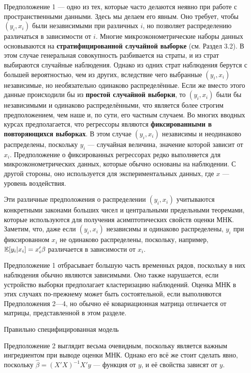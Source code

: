 Предположение 1 --- одно из тех, которые часто делаются неявно при работе с пространственными данными. Здесь мы делаем его явным. Оно требует, чтобы $(y_i, x_i)$ были независимыми при различных $i$, но позволяет распределению различаться в зависимости от $i$. Многие микроэконометрические наборы данных основываются на \textbf{стратифицированной случайной выборке} (см. Раздел 3.2). В этом случае генеральная совокупность разбивается на страты, и из страт выбираются случайные наблюдения. Однако из одних страт наблюдения берутся с большей вероятностью, чем из других, вследствие чего выбранные $(y_i, x_i)$ независимые, но необязательно одинаково распределённые. Если же вместо этого данные происходили бы из \textbf{простой случайной выборки}, то $(y_i, x_i)$  были бы независимыми и одинаково распределёнными, что является более строгим предположением, чем наше и, по сути, его частным случаем. Во многих вводных курсах предполагается, что регрессоры являются \textbf{фиксированными в повторяющихся выборках}. В этом случае  $(y_i, x_i)$ независимы и неодинаково распределены, поскольку $y_i$ --- случайная величина, значение которой зависит от $x_i$. Предположение о фиксированных регрессорах редко выполняется для микроэконометрических данных, которые обычно основаны на наблюдении. С другой стороны, оно используется для экспериментальных данных, где $x$ --- уровень воздействия.

Эти различные предположения о распределении $(y_i, x_i)$ учитываются конкретными законами больших чисел и центральными предельными теоремами, которые используются для получения асимптотических свойств оценки МНК. Заметим, что, даже если $(y_i, x_i)$ независимы и одинаково распределены, $y_i$ при фиксированном $x_i$ не одинаково распределены, поскольку, например, $\mathbb{E}[y_i|x_i] = x_i'\beta$ различается в зависимости от $x_i$.

Предположение 1 отбрасывает большую часть временных рядов, поскольку в них наблюдения обычно являются зависимыми. Оно также нарушается, если устройство выборки предполагает кластеризацию наблюдений. Оценка МНК в этих случаях по-прежнему может быть состоятельной, если выполняются Предположения 2---4, но обычно её ковариационная матрица отличается от матрицы, представленной в этом разделе.

\begin{center}
Правильно специфицированная модель
\end{center}

Предположение 2 выглядит весьма очевидным, поскольку является важным ингредиентом при выводе оценки МНК. Однако его всё же стоит сделать явно, поскольку $\hat{\beta} = (X'X)^{-1} X'y$ --- функция от $y$, и её свойства зависят от $y$.

